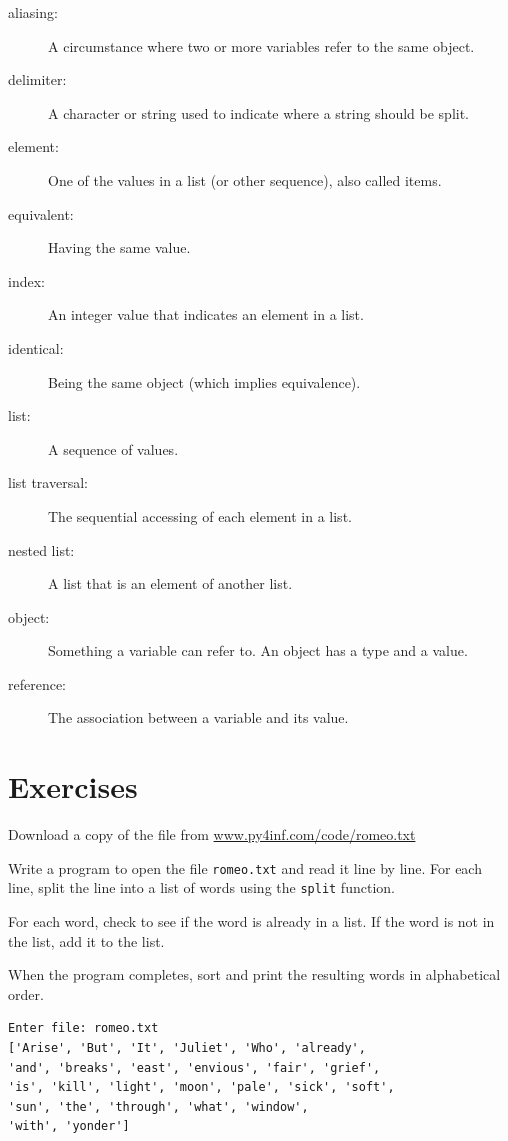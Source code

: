 \documentclass[10pt]{book}
\begin{document}
\begin{description}

\item[aliasing:] A circumstance where two or more variables refer to the same
object.

\item[delimiter:] A character or string used to indicate where a
string should be split.

\item[element:] One of the values in a list (or other sequence),
also called items.

\item[equivalent:] Having the same value.

\item[index:] An integer value that indicates an element in a list.

\item[identical:] Being the same object (which implies equivalence).

\item[list:] A sequence of values.

\item[list traversal:] The sequential accessing of each element in a list.

\item[nested list:] A list that is an element of another list.

\item[object:] Something a variable can refer to.  An object
has a type and a value.

\item[reference:] The association between a variable and its value.

\end{description}


\section{Exercises}

\begin{ex}
Download a copy of the file from 
\url{www.py4inf.com/code/romeo.txt}

Write a program to open the file {\tt romeo.txt} and read it
line by line.  For each line, split the line into  a list of 
words using the {\tt split} function.

For each word, check to see if the word is already in a list.  
If the word is not in the list, add it to the list.  

When the program completes, sort and print the resulting words
in alphabetical order.

\begin{verbatim}
Enter file: romeo.txt
['Arise', 'But', 'It', 'Juliet', 'Who', 'already', 
'and', 'breaks', 'east', 'envious', 'fair', 'grief', 
'is', 'kill', 'light', 'moon', 'pale', 'sick', 'soft', 
'sun', 'the', 'through', 'what', 'window', 
'with', 'yonder']
\end{verbatim}
\end{ex}
\end{document}
